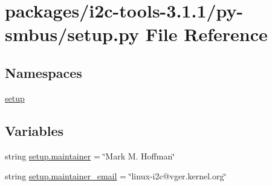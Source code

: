 \hypertarget{packages_2i2c-tools-3_81_81_2py-smbus_2setup_8py}{}\section{packages/i2c-\/tools-\/3.1.1/py-\/smbus/setup.py File Reference}
\label{packages_2i2c-tools-3_81_81_2py-smbus_2setup_8py}
\subsection*{Namespaces}
\begin{DoxyCompactItemize}
\item 
 \hyperlink{namespacesetup}{setup}
\end{DoxyCompactItemize}
\subsection*{Variables}
\begin{DoxyCompactItemize}
\item 
string \hyperlink{namespacesetup_a2d2b97e05b2ec934a59e56cfc0566e8b}{setup.\+maintainer} = \char`\"{}Mark M. Hoffman\char`\"{}
\item 
string \hyperlink{namespacesetup_a722cbcdb0d00c919cbbdd9ffafc96e74}{setup.\+maintainer\+\_\+email} = \char`\"{}linux-\/i2c@vger.\+kernel.\+org\char`\"{}
\end{DoxyCompactItemize}
